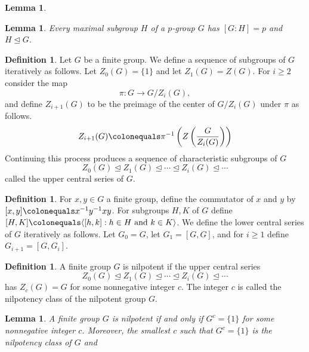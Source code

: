 \documentclass{dcthesis}
\newcommand{\defi}[1]{\textsf{#1}}
\numberwithin{equation}{section}
\newtheorem{lemma}[equation]{Lemma}
\theoremstyle{definition}
\newtheorem{definition}[equation]{Definition}
\theoremstyle{remark}
\begin{document}
{{{\begin{lemma}
    \end{lemma}
    \begin{lemma}
      \label{lem:maximalsubgroup}
      Every maximal subgroup $H$ of a $p$-group $G$
      has $[G:H]=p$ and $H\trianglelefteq G$.
    \end{lemma}
    \begin{definition}
      \label{def:uppercentralseries}
      Let $G$ be a finite group.
      We define a sequence of subgroups of $G$ iteratively as follows.
      Let $Z_0(G) = \{1\}$
      and let $Z_1(G) = Z(G)$.
      For $i\geq 2$ consider
      the map
      \[
        \pi\colon G\to G/Z_i(G),
      \]
      and define $Z_{i+1}(G)$ to be the preimage of the center of $G/Z_i(G)$ under $\pi$
      as follows.
      \[
        Z_{i+1}(G)\colonequals\pi^{-1}
        \left(Z\left(\frac{G}{Z_i(G)}\right)\right)
      \]
      Continuing this process produces a sequence of
      characteristic subgroups of $G$
      \[
        Z_0(G)\trianglelefteq Z_1(G)\trianglelefteq\cdots\trianglelefteq Z_{i}(G)\trianglelefteq\cdots
      \]
      called the \defi{upper central series} of $G$.
    \end{definition}
    \begin{definition}
      \label{def:lowercentralseries}
      For $x,y\in G$ a finite group,
      define the \defi{commutator of $x$ and $y$}
      by
      $[x,y]\colonequals x^{-1}y^{-1}xy$.
      For subgroups $H,K$ of $G$ define
      $[H,K]\colonequals\langle[h,k]:h\in H\text{ and }k\in K\rangle$.
      We define the \defi{lower central series} of $G$ iteratively as follows.
      Let $G_0=G$,
      let $G_1 = [G,G]$,
      and for $i\geq 1$ define
      $G_{i+1}=[G,G_i]$.
    \end{definition}
    \begin{definition}
      \label{def:nilpotentgroup}
      A finite group $G$ is \defi{nilpotent}
      if the upper central series
      \[
        Z_0(G)\trianglelefteq Z_1(G)\trianglelefteq\cdots\trianglelefteq Z_{i}(G)\trianglelefteq\cdots
      \]
      has $Z_c(G) = G$ for some nonnegative integer $c$.
      The integer $c$ is called the \defi{nilpotency class} of
      the nilpotent group $G$.
    \end{definition}
    \begin{lemma}
      \label{lem:upperlowernilpotent}
      A finite group $G$ is nilpotent if and only if
      $G^c=\{1\}$ for some nonnegative integer $c$.
      Moreover,
      the smallest $c$ such that $G^c=\{1\}$
      is the nilpotency class of $G$ and

\end{lemma}}}}
\end{document}
